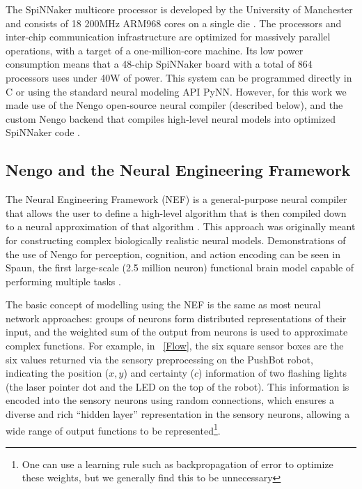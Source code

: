\documentclass{frontiersSCNS}
\begin{document}
The SpiNNaker multicore processor is developed by the University of Manchester 
and consists of 18 200MHz ARM968 cores on a single die \citep{furber2007neural, furber2014spinnaker}. 
The processors and inter-chip communication infrastructure are optimized for
massively parallel operations, with a target of a one-million-core machine.  Its
low power consumption means that a 48-chip SpiNNaker board with a total of 
864 processors uses under 40W of power. This system can be programmed directly 
in C or using the standard neural modeling API PyNN. However, for this work
we made use of the Nengo open-source neural compiler \citep{bekolay_nengo2014} 
(described below), and the custom Nengo backend that compiles high-level
neural models into optimized SpiNNaker code \citep{mundy2015}.

\subsection{Nengo and the Neural Engineering Framework}

The Neural Engineering Framework (NEF) is a general-purpose neural compiler 
that allows the user to define a high-level algorithm that is then compiled 
down to a neural approximation of that algorithm \citep{eliasmith2004neural}. 
This approach was originally meant for constructing complex biologically realistic neural 
models. Demonstrations of the use of Nengo for perception, cognition, and 
action encoding can be seen in Spaun, the first large-scale 
(2.5 million neuron) functional brain model capable of performing multiple 
tasks  \citep{eliasmith_largescale_2012}. 

The basic concept of modelling using the NEF is the same as most neural network
approaches: groups of neurons form distributed representations of their input,
and the weighted sum of the output from neurons is used to approximate
complex functions.  For example, in \figurename~\ref{Flow}, the six square
sensor boxes are the six values returned via the sensory preprocessing on the
PushBot robot, indicating the position ($x, y$) and certainty ($c$) information 
of two flashing lights (the laser pointer dot and the LED on the top of the
robot).  This information is encoded into the sensory neurons using random
connections, which ensures a diverse and rich ``hidden layer''
representation in the sensory neurons, allowing a wide range of output
functions to be represented\footnote{One can use a
learning rule such as backpropagation of error to optimize these weights,
but we generally find this to be unnecessary}.
\end{document}

